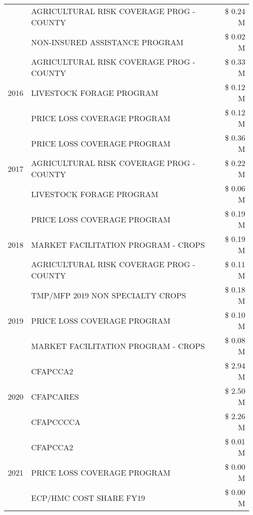 \begin{tabular}{llr}
 & AGRICULTURAL RISK COVERAGE PROG - COUNTY & \$ 0.24 M \\
 & NON-INSURED ASSISTANCE PROGRAM & \$ 0.02 M \\
\cline{1-3}
\multirow[t]{3}{*}{2016} & AGRICULTURAL RISK COVERAGE PROG - COUNTY & \$ 0.33 M \\
 & LIVESTOCK FORAGE PROGRAM & \$ 0.12 M \\
 & PRICE LOSS COVERAGE PROGRAM & \$ 0.12 M \\
\cline{1-3}
\multirow[t]{3}{*}{2017} & PRICE LOSS COVERAGE PROGRAM & \$ 0.36 M \\
 & AGRICULTURAL RISK COVERAGE PROG - COUNTY & \$ 0.22 M \\
 & LIVESTOCK FORAGE PROGRAM & \$ 0.06 M \\
\cline{1-3}
\multirow[t]{3}{*}{2018} & PRICE LOSS COVERAGE PROGRAM & \$ 0.19 M \\
 & MARKET FACILITATION PROGRAM - CROPS & \$ 0.19 M \\
 & AGRICULTURAL RISK COVERAGE PROG - COUNTY & \$ 0.11 M \\
\cline{1-3}
\multirow[t]{3}{*}{2019} & TMP/MFP 2019 NON SPECIALTY CROPS & \$ 0.18 M \\
 & PRICE LOSS COVERAGE PROGRAM & \$ 0.10 M \\
 & MARKET FACILITATION PROGRAM - CROPS & \$ 0.08 M \\
\cline{1-3}
\multirow[t]{3}{*}{2020} & CFAPCCA2 & \$ 2.94 M \\
 & CFAPCARES & \$ 2.50 M \\
 & CFAPCCCCA & \$ 2.26 M \\
\cline{1-3}
\multirow[t]{3}{*}{2021} & CFAPCCA2 & \$ 0.01 M \\
 & PRICE LOSS COVERAGE PROGRAM & \$ 0.00 M \\
 & ECP/HMC COST SHARE FY19 & \$ 0.00 M \\
\cline{1-3}
\bottomrule
\end{tabular}
